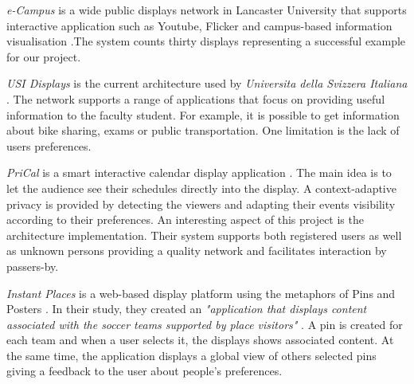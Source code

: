 \documentclass[]{usiinfbachelorproject}
\begin{document}
\emph{e-Campus} is a wide public displays network in Lancaster University that supports interactive application such as Youtube, Flicker and campus-based information visualisation \cite{e_campus}.The system counts thirty displays representing a successful example for our project.

\emph{USI Displays} is the current architecture used by \emph{Universita della Svizzera Italiana} \cite{a_good_balance}. The network supports a range of applications that focus on providing useful information to the faculty student. For example, it is possible to get information about bike sharing, exams or public transportation. One limitation is the lack of users preferences.

\emph{PriCal} is a smart interactive calendar display application \cite{pri_cal}. The main idea is to let the audience see their schedules directly into the display. A context-adaptive privacy is provided by detecting the viewers and adapting their events visibility according to their preferences. An interesting aspect of this project is the architecture implementation. Their system supports both registered users as well as unknown persons providing a quality network and facilitates interaction by passers-by. 

\emph{Instant Places} is a web-based display platform using the metaphors of Pins and Posters \cite{pins_and_posters}. In their study, they created an \emph{"application that displays content associated with the soccer teams supported by place visitors"} \cite{pins_and_posters}. A pin is created for each team and when a user selects it, the displays shows associated content. At the same time, the application displays a global view of others selected pins giving a feedback to the user about people's preferences.

%
%
%
%
%
%
%
\end{document}
